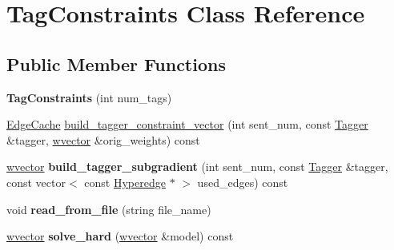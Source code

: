 \hypertarget{classTagConstraints}{
\section{TagConstraints Class Reference}
\label{classTagConstraints}
}
\subsection*{Public Member Functions}
\begin{DoxyCompactItemize}
\item 
\hypertarget{classTagConstraints_a58a2e5245400d411de24e36534d11945}{
{\bfseries TagConstraints} (int num\_\-tags)}
\label{classTagConstraints_a58a2e5245400d411de24e36534d11945}

\item 
\hyperlink{classCache}{EdgeCache} \hyperlink{classTagConstraints_adec1a1de8fb49e79b52c4c93517414a0}{build\_\-tagger\_\-constraint\_\-vector} (int sent\_\-num, const \hyperlink{classTagger}{Tagger} \&tagger, \hyperlink{classsvector}{wvector} \&orig\_\-weights) const 
\item 
\hypertarget{classTagConstraints_acec3818d7505e9147828ab7cb3863001}{
\hyperlink{classsvector}{wvector} {\bfseries build\_\-tagger\_\-subgradient} (int sent\_\-num, const \hyperlink{classTagger}{Tagger} \&tagger, const vector$<$ const \hyperlink{classScarab_1_1HG_1_1Hyperedge}{Hyperedge} $\ast$ $>$ used\_\-edges) const }
\label{classTagConstraints_acec3818d7505e9147828ab7cb3863001}

\item 
\hypertarget{classTagConstraints_a8b8df130795f2fbc1ce2aac375dfc00a}{
void {\bfseries read\_\-from\_\-file} (string file\_\-name)}
\label{classTagConstraints_a8b8df130795f2fbc1ce2aac375dfc00a}

\item 
\hypertarget{classTagConstraints_a3e490a8d4d335ed4d04803fab0a82871}{
\hyperlink{classsvector}{wvector} {\bfseries solve\_\-hard} (\hyperlink{classsvector}{wvector} \&model) const }
\label{classTagConstraints_a3e490a8d4d335ed4d04803fab0a82871}

\end{DoxyCompactItemize}
